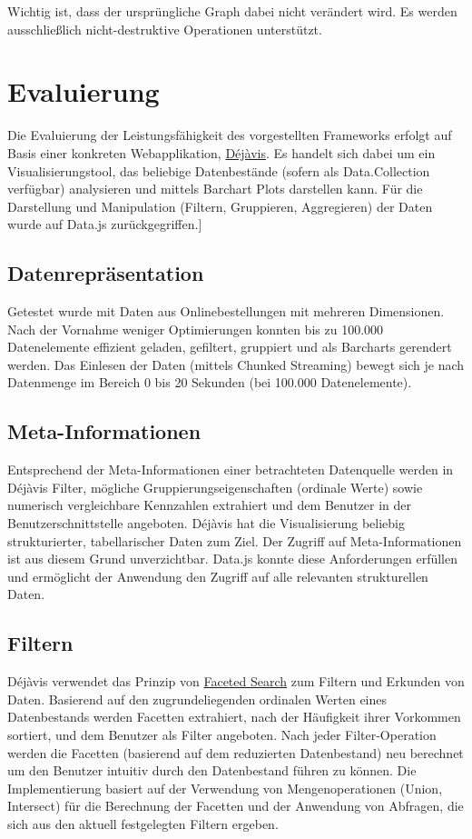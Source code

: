 \documentclass[runningheads]{llncs}
\begin{document}
Wichtig ist, dass der ursprüngliche Graph dabei nicht verändert wird. Es werden ausschließlich nicht-destruktive Operationen unterstützt.

\section{Evaluierung}


Die Evaluierung der Leistungsfähigkeit des vorgestellten Frameworks erfolgt auf Basis einer konkreten Webapplikation,  \href{http://beta.dejavis.org}{Déjàvis}. Es handelt sich dabei um ein Visualisierungstool, das beliebige Datenbestände (sofern als Data.Collection verfügbar) analysieren und mittels Barchart Plots darstellen kann. Für die Darstellung und Manipulation (Filtern, Gruppieren, Aggregieren) der Daten wurde auf Data.js zurückgegriffen.]

\subsection{Datenrepräsentation}


Getestet wurde mit Daten aus Onlinebestellungen mit mehreren Dimensionen. Nach der Vornahme weniger Optimierungen konnten bis zu 100.000 Datenelemente effizient geladen, gefiltert, gruppiert und als Barcharts gerendert werden. Das Einlesen der Daten (mittels Chunked Streaming) bewegt sich je nach Datenmenge im Bereich 0 bis 20 Sekunden (bei 100.000 Datenelemente).

\subsection{Meta-Informationen}


Entsprechend der Meta-Informationen einer betrachteten Datenquelle werden in Déjàvis Filter, mögliche Gruppierungseigenschaften (ordinale Werte) sowie numerisch vergleichbare Kennzahlen extrahiert und dem Benutzer in der Benutzerschnittstelle angeboten. Déjàvis hat die Visualisierung beliebig strukturierter, tabellarischer Daten zum Ziel. Der Zugriff auf Meta-Informationen ist aus diesem Grund unverzichtbar. Data.js konnte diese Anforderungen erfüllen und ermöglicht der Anwendung den Zugriff auf alle relevanten strukturellen Daten.

\subsection{Filtern}


Déjàvis verwendet das Prinzip von  \href{http://en.wikipedia.org/wiki/Faceted_search}{Faceted Search} zum Filtern und Erkunden von Daten. Basierend auf den zugrundeliegenden ordinalen Werten eines Datenbestands werden Facetten extrahiert, nach der Häufigkeit ihrer Vorkommen sortiert, und dem Benutzer als Filter angeboten. Nach jeder Filter-Operation werden die Facetten (basierend auf dem reduzierten Datenbestand) neu berechnet um den Benutzer intuitiv durch den Datenbestand führen zu können. Die Implementierung basiert auf der Verwendung von Mengenoperationen (Union, Intersect) für die Berechnung der Facetten und der Anwendung von Abfragen, die sich aus den aktuell festgelegten Filtern ergeben.
\end{document}
